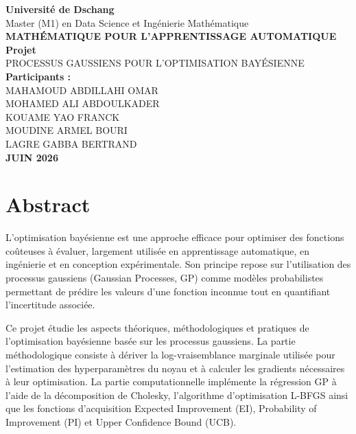 \documentclass[12pt]{article}
\begin{document}
\begin{titlepage}
\centering
\vspace*{1.5cm}
{\Large\bfseries Université de Dschang}\\[1.2cm]
{\large Master (M1) en Data Science et Ingénierie Mathématique}\\[1.5cm]
{\large\bfseries MATHÉMATIQUE POUR L'APPRENTISSAGE AUTOMATIQUE}\\[0.8cm]
{\large\bfseries Projet}\\[0.6cm]
{\large PROCESSUS GAUSSIENS POUR L'OPTIMISATION BAYÉSIENNE}\\[1.5cm]
{\large\bfseries Participants :}\\[0.5cm]
{\large
MAHAMOUD ABDILLAHI OMAR\\[4pt]
MOHAMED ALI ABDOULKADER\\[4pt]
KOUAME YAO FRANCK\\[4pt]
MOUDINE ARMEL BOURI\\[4pt]
LAGRE GABBA BERTRAND\\}
\vfill
{\large\bfseries JUIN 2026}
\end{titlepage}

\section*{Abstract}

L'optimisation bayésienne est une approche efficace pour optimiser des fonctions
coûteuses à évaluer, largement utilisée en apprentissage automatique, en
ingénierie et en conception expérimentale. Son principe repose sur l'utilisation
des processus gaussiens (Gaussian Processes, GP) comme modèles probabilistes
permettant de prédire les valeurs d'une fonction inconnue tout en quantifiant
l'incertitude associée.

Ce projet étudie les aspects théoriques, méthodologiques et pratiques de
l'optimisation bayésienne basée sur les processus gaussiens. La partie
méthodologique consiste à dériver la log-vraisemblance marginale utilisée pour
l'estimation des hyperparamètres du noyau et à calculer les gradients nécessaires
à leur optimisation. La partie computationnelle implémente la régression GP à
l'aide de la décomposition de Cholesky, l'algorithme d'optimisation L-BFGS ainsi
que les fonctions d'acquisition Expected Improvement (EI), Probability of
Improvement (PI) et Upper Confidence Bound (UCB).
\end{document}
